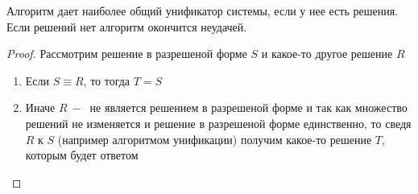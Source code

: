 	\begin{statement} Алгоритм дает наиболее общий унификатор системы, если у нее есть решения. Если решений нет алгоритм окончится неудачей.\end{statement}
	\begin{proof}
	 Рассмотрим решение в разрешеной форме $S$ и какое-то другое решение $R$ \begin{enumerate}
	 \item Если $S\equiv R$, то тогда $T = S$
	 \item Иначе $R\:-\:$ не является решением в разрешеной форме и так как множество решений не изменяется и решение в разрешеной форме единственно, то сведя $R$ к $S$ (например алгоритмом унификации) получим какое-то решение $T$, которым будет ответом
\end{enumerate}
	\end{proof}
